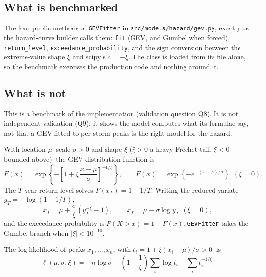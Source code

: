 \documentclass[11pt,a4paper]{article}
\begin{document}
\mkmpurpose

\subsection{What is benchmarked}
The four public methods of \texttt{GEVFitter} in
\texttt{src/models/hazard/gev.py}, exactly as the hazard-curve builder calls
them: \texttt{fit} (GEV, and Gumbel when forced), \texttt{return\_level},
\texttt{exceedance\_probability}, and the sign conversion between the
extreme-value shape $\xi$ and scipy's $c=-\xi$. The class is loaded from its file
alone, so the benchmark exercises the production code and nothing around it.

\subsection{What is not}
This is a benchmark of the implementation (validation question Q8). It is not
independent validation (Q9): it shows the model computes what its formulae say,
not that a GEV fitted to per-storm peaks is the right model for the hazard.

\mkmframework

With location $\mu$, scale $\sigma>0$ and shape $\xi$ ($\xi>0$ a heavy Fr\'echet
tail, $\xi<0$ bounded above), the GEV distribution function is
\begin{equation}
F(x) = \exp\!\left\{-\left[1+\xi\,\frac{x-\mu}{\sigma}\right]^{-1/\xi}\right\},
\qquad
F(x) = \exp\!\left\{-e^{-(x-\mu)/\sigma}\right\}\ \ (\xi=0).
\end{equation}
The $T$-year return level solves $F(x_T)=1-1/T$. Writing the reduced variate
$y_T=-\log(1-1/T)$,
\begin{equation}
x_T = \mu + \frac{\sigma}{\xi}\left(y_T^{-\xi}-1\right),
\qquad x_T = \mu - \sigma\log y_T\ \ (\xi=0),
\end{equation}
and the exceedance probability is $P(X>x) = 1-F(x)$. \texttt{GEVFitter} takes the
Gumbel branch when $|\xi|<10^{-10}$.

The log-likelihood of peaks $x_1,\dots,x_n$, with $t_i = 1+\xi(x_i-\mu)/\sigma>0$, is
\begin{equation}
\ell(\mu,\sigma,\xi) = -n\log\sigma - \left(1+\frac1\xi\right)\sum_i \log t_i
 - \sum_i t_i^{-1/\xi}.
\end{equation}
\end{document}
